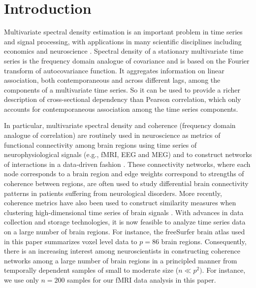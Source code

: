 \section{Introduction}\label{introduction}

Multivariate spectral density estimation is an important problem in time series and signal processing, with applications in many scientific disciplines including economics \citep{granger1969investigating}  and neuroscience \citep{bowyer2016coherence}. Spectral density of a stationary multivariate time series is the frequency domain analogue of covariance and is based on the Fourier transform of autocovariance function. It aggregates information on linear association, both contemporaneous and across different lags,  among the components of a multivariate time series. So it can be used to provide a richer description of cross-sectional dependency than Pearson correlation, which only accounts for contemporaneous association among the time series components. 

In particular, multivariate spectral density and coherence (frequency domain analogue of correlation) are routinely used in neuroscience as metrics of  functional connectivity among brain regions using time series of neurophysiological signals (e.g., fMRI, EEG and MEG) and to construct networks of interactions in a data-driven fashion \citep{bowyer2016coherence}. These connectivity networks, where each node corresponds to a brain region and edge weights correspond to strengths of coherence between regions, are often used to study differential brain connectivity patterns in patients suffering from neurological disorders. More recently, coherence metrics have also been used to construct similarity measures when clustering high-dimensional time series of brain signals \citep{euan2016hierarchical}. With advances in data collection and storage technologies, it is now feasible to analyze time series data on a large number of brain regions. For instance, the freeSurfer brain atlas used in this paper summarizes voxel level data to $p = 86$ brain regions. Consequently, there is an increasing interest among neuroscientists in constructing coherence networks among a large number of brain regions in a principled manner from temporally dependent samples of small to moderate size ($n \ll p^2)$. For instance, we use only $n=200$  samples for our fMRI data analysis in this paper.

